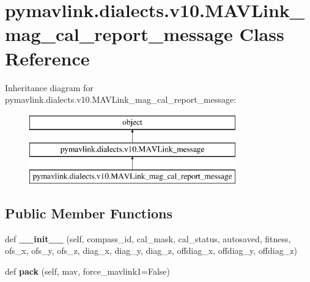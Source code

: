 \hypertarget{classpymavlink_1_1dialects_1_1v10_1_1MAVLink__mag__cal__report__message}{}\section{pymavlink.\+dialects.\+v10.\+M\+A\+V\+Link\+\_\+mag\+\_\+cal\+\_\+report\+\_\+message Class Reference}
\label{classpymavlink_1_1dialects_1_1v10_1_1MAVLink__mag__cal__report__message}
Inheritance diagram for pymavlink.\+dialects.\+v10.\+M\+A\+V\+Link\+\_\+mag\+\_\+cal\+\_\+report\+\_\+message\+:\begin{figure}[H]
\begin{center}
\leavevmode
\includegraphics[height=3.000000cm]{classpymavlink_1_1dialects_1_1v10_1_1MAVLink__mag__cal__report__message}
\end{center}
\end{figure}
\subsection*{Public Member Functions}
\begin{DoxyCompactItemize}
\item 
\mbox{\label{classpymavlink_1_1dialects_1_1v10_1_1MAVLink__mag__cal__report__message_a9fb05da3eb27a6c13dec90f4c0815ebd}} 
def {\bfseries \+\_\+\+\_\+init\+\_\+\+\_\+} (self, compass\+\_\+id, cal\+\_\+mask, cal\+\_\+status, autosaved, fitness, ofs\+\_\+x, ofs\+\_\+y, ofs\+\_\+z, diag\+\_\+x, diag\+\_\+y, diag\+\_\+z, offdiag\+\_\+x, offdiag\+\_\+y, offdiag\+\_\+z)
\item 
\mbox{\label{classpymavlink_1_1dialects_1_1v10_1_1MAVLink__mag__cal__report__message_aa83d10c7ad7e9cf66783d0667b06a9b6}} 
def {\bfseries pack} (self, mav, force\+\_\+mavlink1=False)
\end{DoxyCompactItemize}
